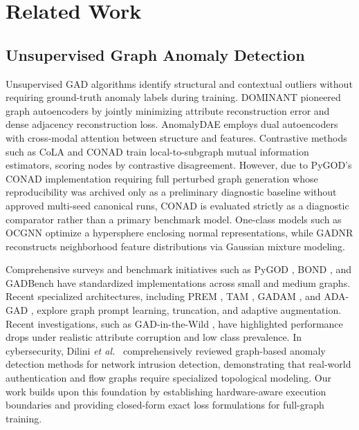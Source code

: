 \documentclass[applsci,article,submit,moreauthors,pdftex]{Definitions/mdpi}
\newcommand{\etal}{\emph{et al.}}
\begin{document}
\section{Related Work}
\label{sec:related}

\subsection{Unsupervised Graph Anomaly Detection}
Unsupervised GAD algorithms identify structural and contextual outliers without requiring ground-truth anomaly labels during training. DOMINANT \cite{ding2019deep} pioneered graph autoencoders by jointly minimizing attribute reconstruction error and dense adjacency reconstruction loss. AnomalyDAE \cite{fan2020anomalydae} employs dual autoencoders with cross-modal attention between structure and features. Contrastive methods such as CoLA \cite{liu2022cola} and CONAD \cite{xu2022conad} train local-to-subgraph mutual information estimators, scoring nodes by contrastive disagreement. However, due to PyGOD's CONAD implementation requiring full perturbed graph generation whose reproducibility was archived only as a preliminary diagnostic baseline without approved multi-seed canonical runs, CONAD is evaluated strictly as a diagnostic comparator rather than a primary benchmark model. One-class models such as OCGNN \cite{wang2021ocgnn} optimize a hypersphere enclosing normal representations, while GADNR \cite{roy2024gadnr} reconstructs neighborhood feature distributions via Gaussian mixture modeling. 

Comprehensive surveys \cite{ma2023survey,qiao2025survey} and benchmark initiatives such as PyGOD \cite{liu2024pygod}, BOND \cite{liu2022bond}, and GADBench \cite{tang2023gadbench} have standardized implementations across small and medium graphs. Recent specialized architectures, including PREM \cite{pan2023prem}, TAM \cite{qiao2023tam}, GADAM \cite{chen2024gadam}, and ADA-GAD \cite{he2024adag}, explore graph prompt learning, truncation, and adaptive augmentation. Recent investigations, such as GAD-in-the-Wild \cite{zhou2026wild}, have highlighted performance drops under realistic attribute corruption and low class prevalence. In cybersecurity, Dilini \etal\ \cite{dilini2026comprehensive} comprehensively reviewed graph-based anomaly detection methods for network intrusion detection, demonstrating that real-world authentication and flow graphs require specialized topological modeling. Our work builds upon this foundation by establishing hardware-aware execution boundaries and providing closed-form exact loss formulations for full-graph training.
\end{document}
